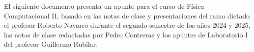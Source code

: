 \documentclass[
	spanish, %
	letterpaper, oneside
]{article}
\begin{document}
\templatePortrait

\templatePagecfg

\begin{abstractd}
  El siguiente documento presenta un apunte para el curso de Física Computacional II, basado en las notas de clase y presentaciones del ramo dictado el profesor Roberto Navarro durante el segundo semestre de los años 2024 y 2025, las notas de clase redactadas por Pedro Contreras y los apuntes de Laboratorio I del profesor Guillermo Rubilar. 
\end{abstractd}

\templateIndex

\templateFinalcfg





\newpage


\newpage






\newpage


\newpage


\end{document}

